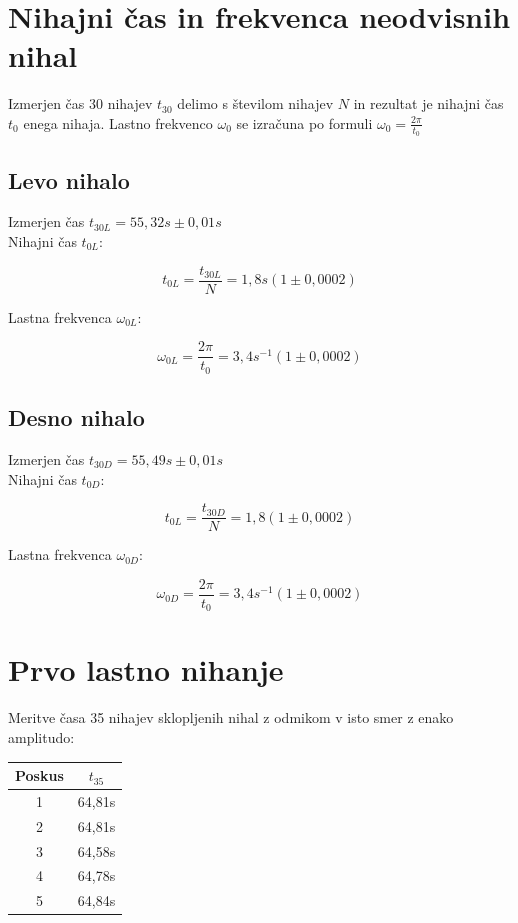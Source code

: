 \documentclass[a4paper]{report}
\begin{document}
\endgroup

\chapter*{Nihajni čas in frekvenca neodvisnih nihal}

Izmerjen čas 30 nihajev $t_{30}$ delimo s številom nihajev $N$ in rezultat je nihajni čas $t_{0}$ enega nihaja. Lastno frekvenco $\omega_0$ se izračuna po formuli $\omega_0= \frac{2\pi}{t_0}$
\section*{Levo nihalo}

Izmerjen čas $t_{30L} = 55,32s \pm 0,01s$ \\
Nihajni čas $t_{0L}$:

\[
  t_{0L} = \frac{t_{30L}}{N} = 1,8s (1 \pm 0,0002)
\]

\noindent Lastna frekvenca $\omega_{0L}$:

\[
  \omega_{0L} = \frac{2\pi}{t_0} = 3,4s^{-1} (1 \pm 0,0002)
\]
  
\section*{Desno nihalo}

Izmerjen čas $t_{30D} = 55,49s \pm 0,01s$ \\
Nihajni čas $t_{0D}$:

\[
  t_{0L} = \frac{t_{30D}}{N} = 1,8 (1 \pm 0,0002)
\]

\noindent Lastna frekvenca $\omega_{0D}$:

\[
  \omega_{0D} = \frac{2\pi}{t_0} = 3,4s^{-1} (1 \pm 0,0002)
\]

\chapter*{Prvo lastno nihanje}

Meritve časa 35 nihajev sklopljenih nihal z odmikom v isto smer z enako amplitudo:

\begin{center}
  \begin{tabular}{| c | c |}
    \hline
    Poskus & $t_{35}$ \\ \hline
    1 & 64,81s \\ \hline
    2 & 64,81s \\ \hline
    3 & 64,58s \\ \hline
    4 & 64,78s \\ \hline
    5 & 64,84s \\
    \hline
  \end{tabular}
\end{center}
\end{document}
